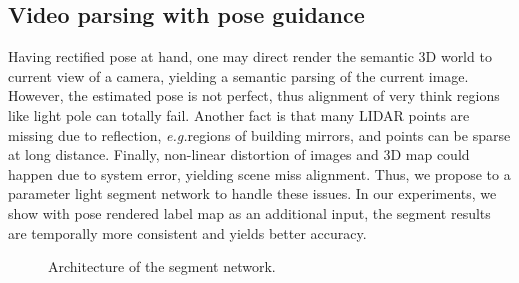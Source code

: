 \documentclass[10pt,twocolumn,letterpaper]{article}
\newcommand{\ve}[1]{{\mathbf #1}} %
\newcommand{\hua}[1]{{\mathcal #1}}
\def\eg{\emph{e.g.}}
\begin{document}
\subsection{Video parsing with pose guidance}
Having rectified pose at hand, one may direct render the semantic 3D world to current view of a camera, yielding a semantic parsing of the current image. However, the estimated pose is not perfect, thus alignment of very think regions like light pole can totally fail. Another fact is that many LIDAR points are missing due to reflection, \eg regions of building mirrors, and points can be sparse at long distance. Finally, non-linear distortion of images and 3D map could happen due to system error, yielding scene miss alignment. Thus, we propose to a parameter light segment network to handle these issues. 
In our experiments, we show with pose rendered label map as an additional input, the segment results are temporally more consistent and yields better accuracy.

\begin{figure*}[]
\fbox{\rule{0pt}{2in} \rule{.9\linewidth}{0pt}}
   \caption{Architecture of the segment network.}
\label{fig:segment}
\end{figure*}
\end{document}
